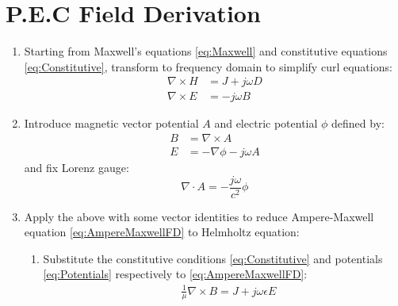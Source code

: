 \section{P.E.C Field Derivation}
    \begin{enumerate}
        \item   Starting from Maxwell's equations \eqref{eq:Maxwell} and constitutive equations \eqref{eq:Constitutive}, transform to frequency domain to simplify curl equations:
                \begin{subequations}\label{eq:MaxwellFD}
                    \begin{align}
                        \nabla \times H &= J + j \omega D \label{eq:AmpereMaxwellFD} \\
                        \nabla \times E &= - j \omega B \label{eq:MaxwellFaradayFD}
                    \end{align}
                \end{subequations}
        \item   Introduce magnetic vector potential $A$ and electric potential $\phi$ defined by:
                \begin{subequations}\label{eq:Potentials}
                    \begin{align}
                        B &= \nabla \times A \label{eq:MagneticPotential} \\
                        E &= - \nabla \phi - j \omega A \label{eq:ElectricPotential}
                    \end{align}
                \end{subequations}
                and fix Lorenz gauge:
                \begin{equation} \label{eq:LorenzGaugeCondition}
                    \nabla \cdot A = - \frac{j \omega}{c^2} \phi
                \end{equation}
        \item   Apply the above with some vector identities to reduce Ampere-Maxwell equation \eqref{eq:AmpereMaxwellFD} to Helmholtz equation:
                \begin{enumerate}
                    \item Substitute the constitutive conditions \eqref{eq:Constitutive} and potentials \eqref{eq:Potentials} respectively to \eqref{eq:AmpereMaxwellFD}:
                        \begin{align*}
                            & \frac{1}{\mu} \nabla \times B = J + j \omega \epsilon E \\

\end{align*}
\end{enumerate}
\end{enumerate}
